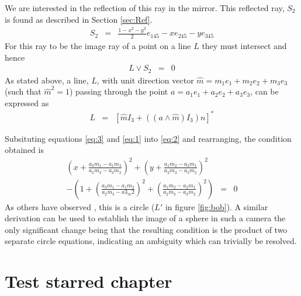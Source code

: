 We are interested in the reflection of this ray in the mirror.  This reflected ray, $S_2$ is found as
described in Section \ref{sec:Ref}.  
\begin{eqnarray} 
\label{eq:1} 
S_2 &=& \frac{1-x^2-y^2}2e_{145} -xe_{245} - y e_{345} 
\end{eqnarray}  
For this ray to be the image ray of a point on a line $L$ they must intersect and hence
\begin{eqnarray} 
\label{eq:2} L\vee S_2 &=& 0 
\end{eqnarray} 
As stated above, a line, $L$, with unit direction vector $\hat{m} = m_1e_1 + m_2e_2 + m_3e_3$ (such that $\hat{m}^2 = 1$) passing through the point $a = a_1e_1 + a_2e_2 + a_3e_3$, can be expressed as 
\begin{eqnarray} 
\label{eq:3} L &=& \left[\hat{m}I_3 + ((a\wedge \hat{m})I_3)n\right]^* 
\end{eqnarray} 

Subsituting equations \ref{eq:3} and \ref{eq:1} into \ref{eq:2} and rearranging, the condition obtained is 
\begin{eqnarray}
  \left(x + \frac{a_3m_1 - a_1m_3}{a_2m_3 -a_3m_2}\right)^2 + \left(y + \frac{a_1m_2 - a_2m_1}{a_2m_3 - a_3m_2}\right)^2 \nonumber&&\\- \left(1 + \left(\frac{a_3m_1 - a_1m_3}{a_2m_3 - a3_m2}\right)^2 + \left(\frac{a_1m_2 - a_2m_1}{a_2m_3 -a_3m_2}\right)^2\right) &=& 0
\end{eqnarray} 
As others have observed \cite{CAM:gd}, this is a circle ($L'$ in figure
		\ref{fig:bob}). A similar derivation can be used to establish
the image of a sphere in such a camera the only significant change being that
the resulting condition is the product of two separate circle equations,
    indicating an ambiguity which can trivially be resolved.  \nocite{CAM:bclf}

\chapter*{Test starred chapter}

